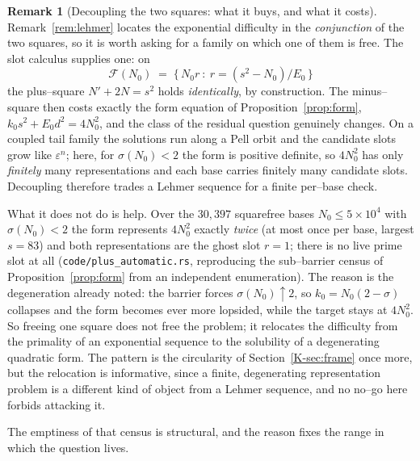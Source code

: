 \documentclass[11pt]{article}
\theoremstyle{definition}
\newtheorem{remark}[theorem]{Remark}
\begin{document}
\begin{remark}[Decoupling the two squares: what it buys, and what it costs]\label{rem:decouple}
Remark~\ref{rem:lehmer} locates the exponential difficulty in the \emph{conjunction} of the two
squares, so it is worth asking for a family on which one of them is free. The slot calculus supplies
one: on
\[ \mathcal F(N_0)\;=\;\bigl\{\,N_0r\ :\ r=(s^2-N_0)/E_0\,\bigr\} \]
the plus--square $N'+2N=s^2$ holds \emph{identically}, by construction. The minus--square then costs
exactly the form equation of Proposition~\ref{prop:form}, $k_0s^2+E_0d^2=4N_0^2$, and the class of
the residual question genuinely changes. On a coupled tail family the solutions run along a Pell
orbit and the candidate slots grow like $\varepsilon^n$; here, for $\sigma(N_0)<2$ the form is
positive definite, so $4N_0^2$ has only \emph{finitely} many representations and each base carries
finitely many candidate slots. Decoupling therefore trades a Lehmer sequence for a finite
per--base check.

What it does not do is help. Over the $30{,}397$ squarefree bases $N_0\le5\times10^4$ with
$\sigma(N_0)<2$ the form represents $4N_0^2$ exactly \emph{twice} (at most once per base, largest
$s=83$) and both representations are the ghost slot $r=1$; there is no live prime slot at all
(\texttt{code/plus\_automatic.rs}, reproducing the sub--barrier census of
Proposition~\ref{prop:form} from an independent enumeration). The reason is the degeneration already
noted: the barrier forces $\sigma(N_0)\uparrow2$, so $k_0=N_0(2-\sigma)$ collapses and the form
becomes ever more lopsided, while the target stays at $4N_0^2$. So freeing one square does not free
the problem; it relocates the difficulty from the primality of an exponential sequence to the
solubility of a degenerating quadratic form. The pattern is the circularity of
Section~\ref{K-sec:frame} once more, but the relocation is informative, since a finite, degenerating
representation problem is a different kind of object from a Lehmer sequence, and no no--go here
forbids attacking it.
\end{remark}

The emptiness of that census is structural, and the reason fixes the range in which the question
lives.
\end{document}
